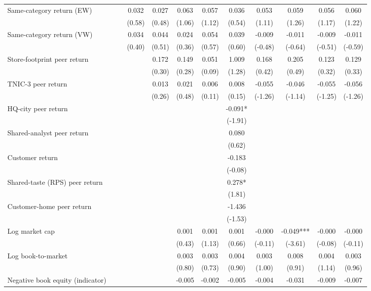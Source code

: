 \begin{table}
\begin{tabular*}{\linewidth}{@{\extracolsep{\fill}}lccccccccccc}
Same-category return (EW) &  &  & 0.032 & 0.027 & 0.063 & 0.057 & 0.036 & 0.053 & 0.059 & 0.056 & 0.060 \\
 &  &  & (0.58) & (0.48) & (1.06) & (1.12) & (0.54) & (1.11) & (1.26) & (1.17) & (1.22) \\
Same-category return (VW) &  &  & 0.034 & 0.044 & 0.024 & 0.054 & 0.039 & -0.009 & -0.011 & -0.009 & -0.011 \\
 &  &  & (0.40) & (0.51) & (0.36) & (0.57) & (0.60) & (-0.48) & (-0.64) & (-0.51) & (-0.59) \\
Store-footprint peer return &  &  &  & 0.172 & 0.149 & 0.051 & 1.009 & 0.168 & 0.205 & 0.123 & 0.129 \\
 &  &  &  & (0.30) & (0.28) & (0.09) & (1.28) & (0.42) & (0.49) & (0.32) & (0.33) \\
TNIC-3 peer return &  &  &  & 0.013 & 0.021 & 0.006 & 0.008 & -0.055 & -0.046 & -0.055 & -0.056 \\
 &  &  &  & (0.26) & (0.48) & (0.11) & (0.15) & (-1.26) & (-1.14) & (-1.25) & (-1.26) \\
HQ-city peer return &  &  &  &  &  &  & -0.091* &  &  &  &  \\
 &  &  &  &  &  &  & (-1.91) &  &  &  &  \\
Shared-analyst peer return &  &  &  &  &  &  & 0.080 &  &  &  &  \\
 &  &  &  &  &  &  & (0.62) &  &  &  &  \\
Customer return &  &  &  &  &  &  & -0.183 &  &  &  &  \\
 &  &  &  &  &  &  & (-0.08) &  &  &  &  \\
Shared-taste (RPS) peer return &  &  &  &  &  &  & 0.278* &  &  &  &  \\
 &  &  &  &  &  &  & (1.81) &  &  &  &  \\
Customer-home peer return &  &  &  &  &  &  & -1.436 &  &  &  &  \\
 &  &  &  &  &  &  & (-1.53) &  &  &  &  \\
Log market cap &  &  &  &  & 0.001 & 0.001 & 0.001 & -0.000 & -0.049*** & -0.000 & -0.000 \\
 &  &  &  &  & (0.43) & (1.13) & (0.66) & (-0.11) & (-3.61) & (-0.08) & (-0.11) \\
Log book-to-market &  &  &  &  & 0.003 & 0.003 & 0.004 & 0.003 & 0.008 & 0.004 & 0.003 \\
 &  &  &  &  & (0.80) & (0.73) & (0.90) & (1.00) & (0.91) & (1.14) & (0.96) \\
Negative book equity (indicator) &  &  &  &  & -0.005 & -0.002 & -0.005 & -0.004 & -0.031 & -0.009 & -0.007 \\

\end{tabular*}
\end{table}
